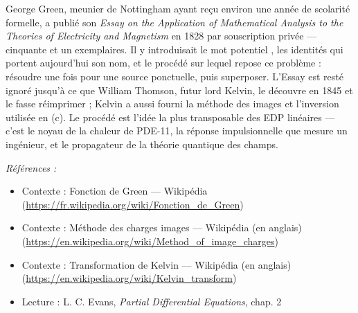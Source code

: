 \documentclass[11pt]{article}
\newenvironment{refs}{\par\small\noindent\emph{Références :}\begin{itemize}\setlength\itemsep{0pt}}{\end{itemize}\normalsize}
\begin{document}
\noindent George Green, meunier de Nottingham ayant reçu environ une année de scolarité
formelle, a publié son \textit{Essay on the Application of Mathematical Analysis to the Theories of
Electricity and Magnetism} en 1828 par souscription privée --- cinquante et un exemplaires. Il y
introduisait le mot \og{} potentiel \fg{}, les identités qui portent aujourd'hui son nom, et le procédé sur
lequel repose ce problème : résoudre une fois pour une source ponctuelle, puis superposer. L'Essay
est resté ignoré jusqu'à ce que William Thomson, futur lord Kelvin, le découvre en 1845 et le fasse
réimprimer ; Kelvin a aussi fourni la méthode des images et l'inversion utilisée en (c). Le procédé
est l'idée la plus transposable des EDP linéaires --- c'est le noyau de la chaleur de PDE-11, la
réponse impulsionnelle que mesure un ingénieur, et le propagateur de la théorie quantique des
champs.

\begin{refs}
\item Contexte : Fonction de Green --- Wikipédia (\url{https://fr.wikipedia.org/wiki/Fonction_de_Green})
\item Contexte : Méthode des charges images --- Wikipédia (en anglais) (\url{https://en.wikipedia.org/wiki/Method_of_image_charges})
\item Contexte : Transformation de Kelvin --- Wikipédia (en anglais) (\url{https://en.wikipedia.org/wiki/Kelvin_transform})
\item Lecture : L. C. Evans, \textit{Partial Differential Equations}, chap. 2
\end{refs}

\bigskip
\end{document}
